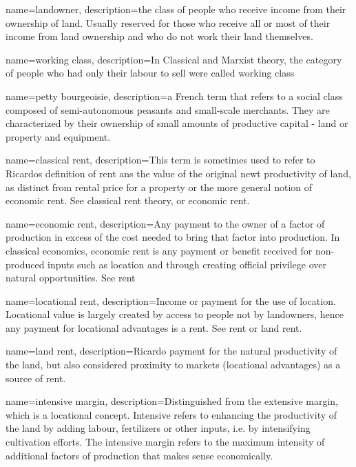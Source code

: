 {
name=landowner,
description={the class of people who receive income from their ownership of land. Usually reserved for those who receive all or most of their income from land ownership and who do not work their land themselves.}
}

{
name=working class,
description={In Classical and Marxist theory, the category of people who had only their labour to sell were called working class}
}


{
name=petty bourgeoisie,
description={a French term that refers to a social class composed of semi-autonomous peasants and small-scale merchants. They are characterized by their ownership of small amounts of productive capital - land or property and equipment.}
}

{
name=classical rent,
description={This term is sometimes used to refer to Ricardos definition of rent ans the value of the original newt productivity of land, as distinct from rental price for a property or the more general notion of economic rent. See \gls{classical rent theory}, or \gls{economic rent}.}
}

{
name=economic rent,
description={Any payment to the owner of a factor of production in excess of the cost needed to bring that factor into production. In classical economics, economic rent is any payment  or benefit received for non-produced inputs such as location and through creating official privilege over natural opportunities. See \gls{rent}}
}

{
name=locational rent,
description={Income or payment for the use of location. Locational value is largely created by access to people not by landowners, hence any payment for locational advantages is a rent. See \gls{rent} or \gls{land rent}.}
}

{
name=land rent,
description={Ricardo payment for  the natural productivity of the land, but also considered proximity to markets (locational advantages) as a source of rent. }
}

{
name=intensive margin,
description={Distinguished from the \gls{extensive margin}, which is a locational concept. Intensive refers to  enhancing the productivity of  the land by adding labour, fertilizers or other inputs, i.e. by intensifying cultivation efforts.  The intensive margin refers to the maximum intensity of additional factors of production that makes sense economically. }
}

